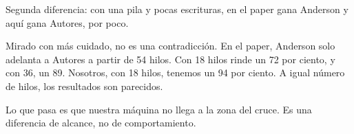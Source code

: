 Segunda diferencia: con una pila y pocas escrituras, en el paper gana Anderson y aquí gana Autores, por poco.

Mirado con más cuidado, no es una contradicción. En el paper, Anderson solo adelanta a Autores a partir de 54 hilos. Con 18 hilos rinde un 72 por ciento, y con 36, un 89. Nosotros, con 18 hilos, tenemos un 94 por ciento. A igual número de hilos, los resultados son parecidos.

Lo que pasa es que nuestra máquina no llega a la zona del cruce. Es una diferencia de alcance, no de comportamiento.
